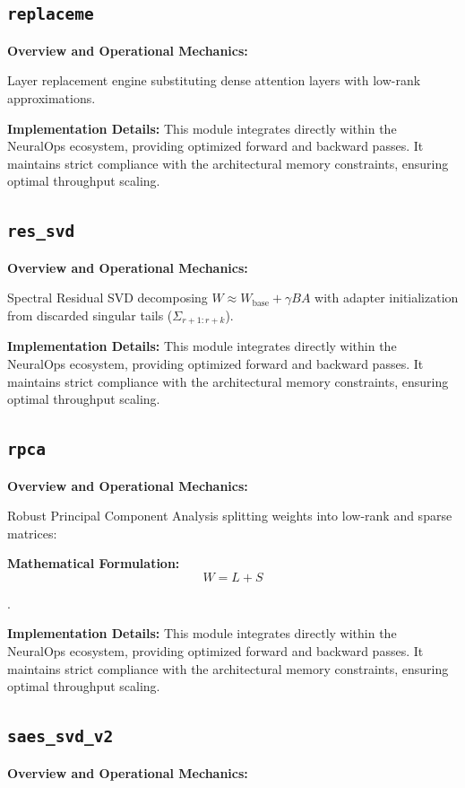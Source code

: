 \documentclass[10pt,twocolumn,letterpaper]{article}
\begin{document}
\subsection{\texttt{replaceme}}
\textbf{Overview and Operational Mechanics:}

Layer replacement engine substituting dense attention layers with low-rank approximations.

\textbf{Implementation Details:}
This module integrates directly within the NeuralOps ecosystem, providing optimized forward and backward passes. It maintains strict compliance with the architectural memory constraints, ensuring optimal throughput scaling.

\subsection{\texttt{res\_svd}}
\textbf{Overview and Operational Mechanics:}

Spectral Residual SVD decomposing $W \approx W_{\text{base}} + \gamma B A$ with adapter initialization from discarded singular tails ($\Sigma_{r+1 : r+k}$).

\textbf{Implementation Details:}
This module integrates directly within the NeuralOps ecosystem, providing optimized forward and backward passes. It maintains strict compliance with the architectural memory constraints, ensuring optimal throughput scaling.

\subsection{\texttt{rpca}}
\textbf{Overview and Operational Mechanics:}

Robust Principal Component Analysis splitting weights into low-rank and sparse matrices:

\textbf{Mathematical Formulation:}
\begin{equation}
W = L + S
\end{equation}

.

\textbf{Implementation Details:}
This module integrates directly within the NeuralOps ecosystem, providing optimized forward and backward passes. It maintains strict compliance with the architectural memory constraints, ensuring optimal throughput scaling.

\subsection{\texttt{saes\_svd\_v2}}
\textbf{Overview and Operational Mechanics:}
\end{document}
